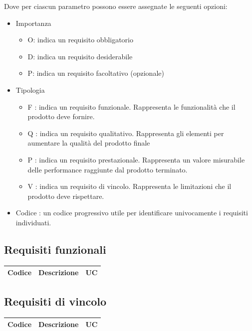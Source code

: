 Dove per ciascun parametro possono essere assegnate le seguenti opzioni:
\begin{itemize}
	\item Importanza
	\begin{itemize}
		\item O: indica un requisito obbligatorio
		\item D: indica un requisito desiderabile
		\item P: indica un requisito facoltativo (opzionale)
	\end{itemize}
	\item Tipologia
	\begin{itemize}
		\item F : indica un requisito funzionale. Rappresenta le funzionalità che il prodotto
		deve fornire.
		\item Q : indica un requisito qualitativo. Rappresenta gli elementi per aumentare
		la qualità del prodotto finale
		\item  P : indica un requisito prestazionale. Rappresenta un valore misurabile delle
		performance raggiunte dal prodotto terminato.
		\item V : indica un requisito di vincolo. Rappresenta le limitazioni che il prodotto
		deve rispettare.
	\end{itemize}
	\item Codice : un codice progressivo utile per identificare univocamente i requisiti individuati.
\end{itemize}

\subsection{Requisiti funzionali}
\begin{center}
	\begin{tabularx}{\textwidth}{|c|X|c|}
		\hline
		\textbf{Codice} & \textbf{Descrizione} & \textbf{UC} \\
		
		\hline
	\end{tabularx}
\end{center}


\subsection{Requisiti di vincolo}
\begin{center}
	\begin{tabularx}{\textwidth}{|c|X|c|}
		\hline
		\textbf{Codice} & \textbf{Descrizione} & \textbf{UC} \\
		\hline
	\end{tabularx}
\end{center}




